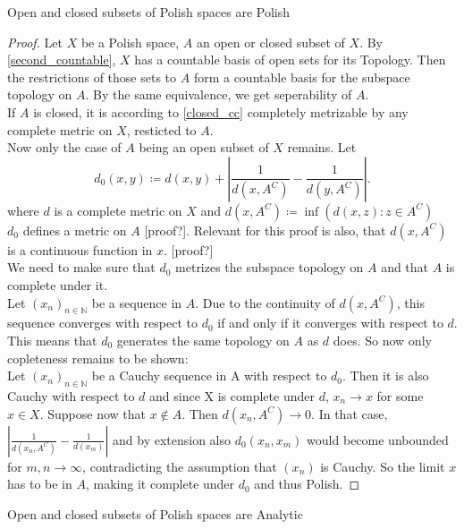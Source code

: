 \documentclass[10pt, a4paper, titlepage]{article}
\numberwithin{equation}{section}
\begin{document}
\begin{corollary}
	Open and closed subsets of Polish spaces are Polish
\end{corollary}
\begin{proof}
	Let $X$ be a Polish space, $A$ an open or closed subset of $X$.
	By \autoref{second_countable}, $X$ has a countable basis of open sets for its Topology. Then the restrictions of those sets to  $A$ form  a countable basis for the subspace topology on $A$. 
By the same equivalence, we get seperability of  $A$.\\
If $A$ is closed, it is according to \autoref{closed_cc} completely metrizable by any complete metric on $X$, resticted to  $A$.\\
Now only the case of  $A$ being an open subset of  $X$ remains.
Let  \[
d_0 \left( x,y \right)  \coloneq d\left( x,y \right) + \left| \frac{1}{d\left( x,A^{C} \right) } - \frac{1}{d\left( y,A^C \right) } \right| 
.\]
where $d$ is a complete metric on  $X$ and  $d\left( x,A^C \right)  \coloneq \inf\left( d\left( x,z \right): z \in A^C \right)  $\\
$d_0$ defines a metric on $A$ [proof?]. Relevant for this proof is also, that $d\left( x,A^C \right) $ is a continuous function in $x$. [proof?]\\
We need to make sure that $d_0$ metrizes the subspace topology on $A$ and that  $A$ is complete under it.\\
Let $\left( x_{n} \right)_{n \in \mathbb{N}}$ be a sequence in $A$. Due to the continuity of  $d\left( x,A^C \right) $, this sequence converges with respect to $d_0$ if and only if it converges with respect to $d$. This means that $d_0$ generates the same topology on $A$ as  $d$ does. So now only copleteness remains to be shown: \\
Let $(x_{n})_{n \in  \mathbb{N}} $ be a Cauchy sequence in A with respect to $d_0$. Then it is also Cauchy with respect to $d$ and since X is complete under  $d$, $x_{n} \to x$ for some $x \in X$. 
Suppose now that $x \notin A$. Then  $d\left( x_{n},A^{C} \right) \to 0$. In that case, $\left| \frac{1}{d\left( x_{n},A^C \right) }- \frac{1}{d\left( x_m \right) } \right| $ and by extension also $d_0\left( x_{n},x_m \right) $ would become unbounded for $m,n \to \infty$, contradicting the assumption that $\left( x_{n} \right) $ is Cauchy. 
So the limit $x$ has to be in  $A$, making it complete under $d_0$ and thus Polish. 
\end{proof}


\begin{theorem}
	\label{open_closed_cc}
	Open and closed subsets of Polish spaces are Analytic
\end{theorem}
\end{document}
